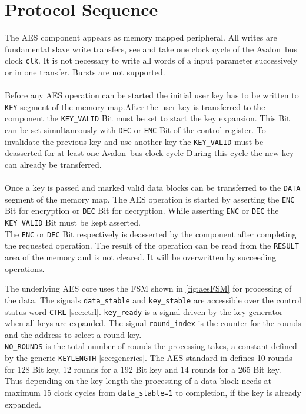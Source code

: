 \documentclass{ruschidoc}
\begin{document}
\section{Protocol Sequence}
\label{sec:usage}
The AES component appears as memory mapped peripheral. All writes are fundamental slave write transfers, see \cite{Altera:Avalon} and take one 
clock cycle of the Avalon\rtm\ bus clock \texttt{clk}. It is not necessary to write all words of a input parameter successively or in one transfer. 
Bursts are not supported.\\
\\
Before any AES operation can be started the initial user key has to be written to
\texttt{KEY} segment of the memory map.After the user key is transferred
to the component the \texttt{KEY\_VALID} Bit must be set to start the key
expansion. This Bit can be set simultaneously with \texttt{DEC} or \texttt{ENC} Bit of
the control register. To invalidate the previous key and use another key the
\texttt{KEY\_VALID} must be deasserted for at least one Avalon\rtm\ bus clock cycle
During this cycle the new key can already be transferred.\\
\\
Once a key is passed and marked valid data blocks can be transferred to the
\texttt{DATA} segment of the memory map. 
The AES operation is started by asserting the \texttt{ENC} Bit for
encryption or \texttt{DEC} Bit for decryption. 
While asserting \texttt{ENC} or \texttt{DEC} the \texttt{KEY\_VALID} Bit must be
kept asserted.\\ 
The \texttt{ENC} or \texttt{DEC} Bit respectively is deasserted by the component
after completing the requested operation.
The result of the operation can be read from the \texttt{RESULT} area of the memory
and is not cleared. It will be overwritten by succeeding operations. 

The underlying AES core uses the \gls{FSM} shown in \ref{fig:aesFSM} for processing of
the data. The signals \texttt{data\_stable} and \texttt{key\_stable} are accessible
over the control status word \texttt{CTRL} \ref{sec:ctrl}. \texttt{key\_ready} is a
signal driven by the key generator when all keys are expanded. The signal
\texttt{round\_index} is the counter for the rounds and the address to select a
round key. \\
\texttt{NO\_ROUNDS} is the total number of rounds the processing takes, a constant
defined by the generic \texttt{KEYLENGTH} \ref{sec:generics}. The AES standard
in\cite{NIST:Fips197} defines 10 rounds for 128 Bit key, 12 rounds for a 192 Bit key
and 14 rounds for a 265 Bit key.\\
Thus depending on the key length the processing of a data block needs at maximum 15
clock cycles from \texttt{data\_stable=1} to completion, if the key is already expanded.
\end{document}
